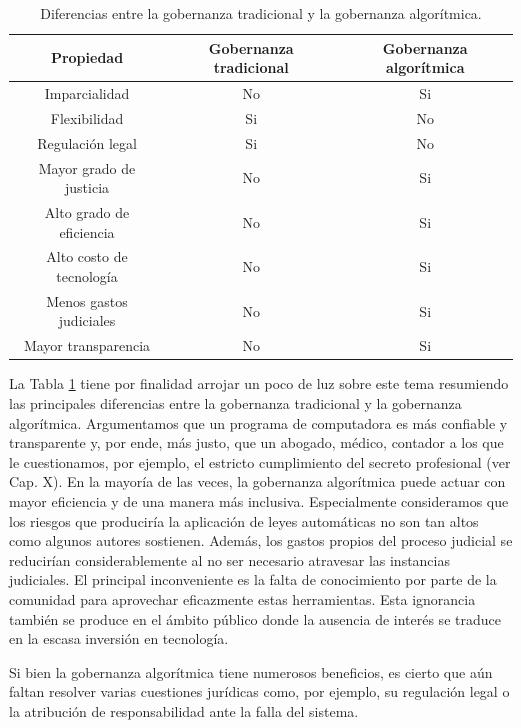 \documentclass[12pt]{report} %
\begin{document}
\begin{table}
\centering
\begin{tabular}{|c|c|c|} 
 \hline
Propiedad & Gobernanza tradicional & Gobernanza algorítmica \\
\hline
 Imparcialidad            & No  & Si \\ 
Flexibilidad             & Si  & No \\ 
Regulación legal         & Si  & No \\ 
Mayor grado de justicia  & No  & Si \\
Alto grado de eficiencia & No  & Si \\
Alto costo de tecnología & No  & Si \\ 
Menos gastos judiciales  & No  & Si \\ 
Mayor transparencia      & No  & Si \\ 
\hline
\end{tabular}
\caption{Diferencias entre la gobernanza tradicional y la gobernanza algorítmica.}
\label{tab:gobtrad_vs_gobalgo}
\end{table}


La Tabla \ref{tab:gobtrad_vs_gobalgo} tiene por finalidad arrojar un poco de luz sobre este tema resumiendo las principales diferencias entre la gobernanza tradicional y la gobernanza algorítmica. Argumentamos que un programa de computadora es más confiable y transparente y, por ende, más justo, que un abogado, médico, contador a los que le cuestionamos, por ejemplo, el estricto cumplimiento del secreto profesional (ver Cap. X). En la mayoría de las veces, la gobernanza algorítmica puede actuar con mayor eficiencia y de una manera más inclusiva. Especialmente consideramos que los riesgos que produciría la aplicación de leyes automáticas no son tan altos como algunos autores sostienen. Además, los gastos propios del proceso judicial se reducirían considerablemente al no ser necesario atravesar las instancias judiciales. El principal inconveniente es la falta de conocimiento por parte de la comunidad para aprovechar eficazmente estas herramientas. Esta ignorancia también se produce en el ámbito público donde la ausencia de interés se traduce en la escasa inversión en tecnología.

Si bien la gobernanza algorítmica tiene numerosos beneficios, es cierto que aún faltan resolver varias cuestiones jurídicas como, por ejemplo, su regulación legal o la atribución de responsabilidad ante la falla del sistema. 
\end{document}
